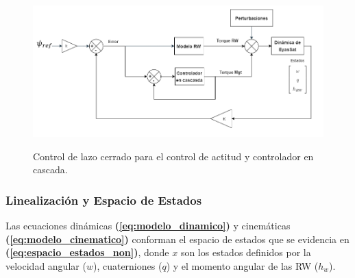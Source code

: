 \begin{itemize}
	 \begin{figure}[!ht]
	 	\begin{center}
	 		\includegraphics[scale=0.55]{imagenes/controladores/Diagrama_controlador2.PNG}\\
	 	\end{center}
	 	\caption{Control de lazo cerrado para el control de actitud y controlador en cascada.}
	 	\label{fig:desaturacionDiagrama2}	 	
	 \end{figure} 	  
\end{itemize}



\subsubsection{Linealización y Espacio de Estados}
\hfill \break
Las ecuaciones dinámicas \textbf{(\ref{eq:modelo_dinamico})} y cinemáticas \textbf{(\ref{eq:modelo_cinematico})} conforman el espacio de estados que se evidencia en 
\textbf{(\ref{eq:espacio_estados_non})}, donde $x$ son los estados definidos por la velocidad angular ($w$), cuaterniones ($q$) y el momento angular de las RW ($h_w$). 

